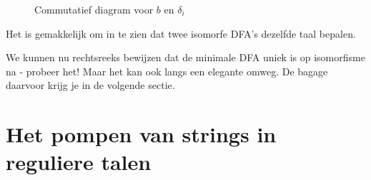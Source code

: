 \begin{figure}[h]
\caption{Commutatief diagram voor $b$ en $\delta_i$\label{diagram1}}
\end{figure}


Het is gemakkelijk om in te zien dat twee isomorfe DFA's dezelfde taal
bepalen.


We kunnen nu rechtsreeks bewijzen dat de minimale DFA uniek is op
isomorfisme na - probeer het! Maar het kan ook langs een elegante
omweg. De bagage daarvoor krijg je in de volgende sectie.




\section{Het pompen van strings in reguliere talen}

